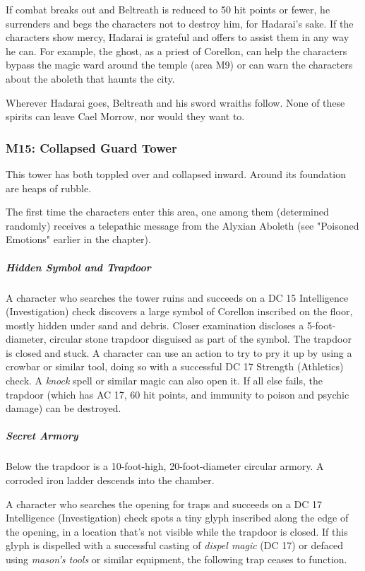 \documentclass[10pt,a4paper,twoside,bg=print,twocolumn,openany,nodeprecatedcode]{dndbook}
\begin{document}
If combat breaks out and Beltreath is reduced to 50 hit points or fewer, he surrenders and begs the characters not to destroy him, for Hadarai's sake. If the characters show mercy, Hadarai is grateful and offers to assist them in any way he can. For example, the ghost, as a priest of Corellon, can help the characters bypass the magic ward around the temple (area M9) or can warn the characters about the aboleth that haunts the city.

Wherever Hadarai goes, Beltreath and his sword wraiths follow. None of these spirits can leave Cael Morrow, nor would they want to.

\subsubsection{M15: Collapsed Guard Tower}
\begin{DndReadAloud}{}
This tower has both toppled over and collapsed inward. Around its foundation are heaps of rubble.

\end{DndReadAloud}

The first time the characters enter this area, one among them (determined randomly) receives a telepathic message from the Alyxian Aboleth (see "Poisoned Emotions" earlier in the chapter).

\subparagraph{Hidden Symbol and Trapdoor}
A character who searches the tower ruins and succeeds on a DC 15 Intelligence (Investigation) check discovers a large symbol of Corellon inscribed on the floor, mostly hidden under sand and debris. Closer examination discloses a 5-foot-diameter, circular stone trapdoor disguised as part of the symbol. The trapdoor is closed and stuck. A character can use an action to try to pry it up by using a crowbar or similar tool, doing so with a successful DC 17 Strength (Athletics) check. A \textit{knock} spell or similar magic can also open it. If all else fails, the trapdoor (which has AC 17, 60 hit points, and immunity to poison and psychic damage) can be destroyed.

\subparagraph{Secret Armory}
Below the trapdoor is a 10-foot-high, 20-foot-diameter circular armory. A corroded iron ladder descends into the chamber.

A character who searches the opening for traps and succeeds on a DC 17 Intelligence (Investigation) check spots a tiny glyph inscribed along the edge of the opening, in a location that's not visible while the trapdoor is closed. If this glyph is dispelled with a successful casting of \textit{dispel magic} (DC 17) or defaced using \textit{mason's tools} or similar equipment, the following trap ceases to function.
\end{document}
